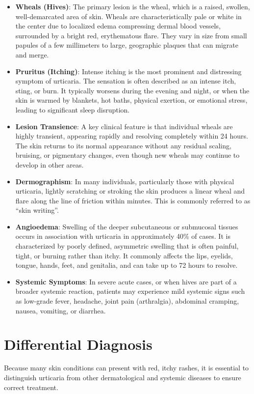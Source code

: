 \begin{itemize}
    \item \textbf{Wheals (Hives)}: The primary lesion is the wheal, which is a raised, swollen, well-demarcated area of skin. Wheals are characteristically pale or white in the center due to localized edema compressing dermal blood vessels, surrounded by a bright red, erythematous flare. They vary in size from small papules of a few millimeters to large, geographic plaques that can migrate and merge.
    \item \textbf{Pruritus (Itching)}: Intense itching is the most prominent and distressing symptom of urticaria. The sensation is often described as an intense itch, sting, or burn. It typically worsens during the evening and night, or when the skin is warmed by blankets, hot baths, physical exertion, or emotional stress, leading to significant sleep disruption.
    \item \textbf{Lesion Transience}: A key clinical feature is that individual wheals are highly transient, appearing rapidly and resolving completely within 24 hours. The skin returns to its normal appearance without any residual scaling, bruising, or pigmentary changes, even though new wheals may continue to develop in other areas.
    \item \textbf{Dermographism}: In many individuals, particularly those with physical urticaria, lightly scratching or stroking the skin produces a linear wheal and flare along the line of friction within minutes. This is commonly referred to as ``skin writing''.
    \item \textbf{Angioedema}: Swelling of the deeper subcutaneous or submucosal tissues occurs in association with urticaria in approximately 40\% of cases. It is characterized by poorly defined, asymmetric swelling that is often painful, tight, or burning rather than itchy. It commonly affects the lips, eyelids, tongue, hands, feet, and genitalia, and can take up to 72 hours to resolve.
    \item \textbf{Systemic Symptoms}: In severe acute cases, or when hives are part of a broader systemic reaction, patients may experience mild systemic signs such as low-grade fever, headache, joint pain (arthralgia), abdominal cramping, nausea, vomiting, or diarrhea.
\end{itemize}

\section*{Differential Diagnosis}
Because many skin conditions can present with red, itchy rashes, it is essential to distinguish urticaria from other dermatological and systemic diseases to ensure correct treatment.

